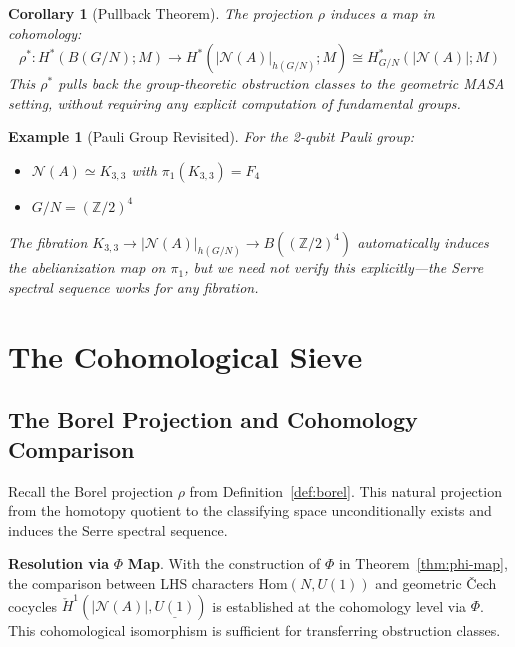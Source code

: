 \documentclass[11pt]{article}
\newtheorem{corollary}[theorem]{Corollary}
\newtheorem{example}[theorem]{Example}
\begin{document}
\begin{corollary}[Pullback Theorem]\label{cor:pullback}
The projection $\rho$ induces a map in cohomology:
\[
\rho^*: H^*(B(G/N); M) \longrightarrow H^*(|\mathcal{N}(A)|_{h(G/N)}; M) \cong H^*_{G/N}(|\mathcal{N}(A)|; M)
\]
This $\rho^*$ pulls back the group-theoretic obstruction classes to the geometric MASA setting, without requiring any explicit computation of fundamental groups.
\end{corollary}

\begin{example}[Pauli Group Revisited]\label{ex:pauli-revisited}
For the 2-qubit Pauli group:
\begin{itemize}
\item $\mathcal{N}(A) \simeq K_{3,3}$ with $\pi_1(K_{3,3}) = F_4$
\item $G/N = (\mathbb{Z}/2)^4$
\end{itemize}
The fibration $K_{3,3} \to |\mathcal{N}(A)|_{h(G/N)} \to B((\mathbb{Z}/2)^4)$ automatically induces the abelianization map on $\pi_1$, but we need not verify this explicitly---the Serre spectral sequence works for any fibration.
\end{example}


\section{The Cohomological Sieve}
\label{cohomological-sieve}

\subsection{The Borel Projection and Cohomology Comparison}
\label{two-maps}

Recall the Borel projection $\rho$ from Definition~\ref{def:borel}. This natural projection from the homotopy quotient to the classifying space unconditionally exists and induces the Serre spectral sequence.

\textbf{Resolution via }$\Phi$\textbf{ Map}.
With the construction of $\Phi$ in Theorem~\ref{thm:phi-map}, the comparison between LHS characters $\mathrm{Hom}(N, U(1))$ and geometric \v{C}ech cocycles $\check{H}^1(|\mathcal{N}(A)|, \underline{U(1)})$ is established at the cohomology level via $\Phi$. This cohomological isomorphism is sufficient for transferring obstruction classes.
\end{document}

